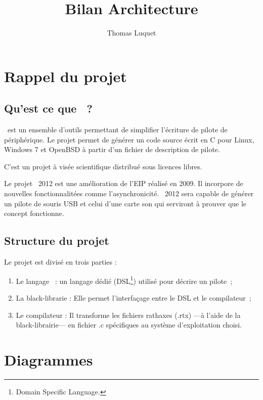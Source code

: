 \documentclass{rtxreport}
\author{Thomas Luquet}
\title{Bilan Architecture}
\begin{document}
\maketitle

\rtxmaketitleblock

\tableofcontents

\chapter{Rappel du projet}

\section{Qu'est ce que \rtx\ ?}

\rtx\ est un ensemble d'outils permettant de simplifier l'écriture de pilote de
périphérique. Le projet permet de générer un code source écrit en C pour Linux,
Windows 7 et OpenBSD à partir d'un fichier de description de pilote.

C'est un projet à visée scientifique distribué sous licences libres.

Le projet \rtx\ 2012 est une amélioration de l'EIP réalisé en 2009. Il
incorpore de nouvelles fonctionnalitées comme l’asynchronicité. \rtx\ 2012 sera
capable de générer un pilote de souris USB et celui d'une carte son qui
serviront à prouver que le concept fonctionne.

\section{Structure du projet}

Le projet est divisé en trois parties :
\begin{enumerate}
\item Le langage \rtx\ : un langage dédié (DSL\footnote{Domain Specific
Language.}) utilisé pour décrire un pilote~;
\item La black-librarie : Elle permet l'interfaçage entre le DSL et le
compilateur~;
\item Le compilateur : Il transforme les fichiers rathaxes (.rtx) ---à l'aide
de la black-librairie--- en fichier .c spécifiques au système d'exploitation choisi.
\end{enumerate}

\chapter{Diagrammes}
\end{document}
